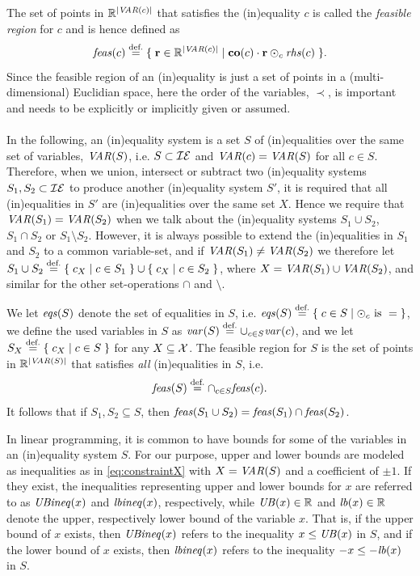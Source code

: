 The set of points in $\mathbb{R}^{|\mathit{VAR}(c)|}$ that satisfies the (in)equality $c$ is called the \emph{feasible region} for $c$ and is hence defined as
\[
\mathit{feas}(c) \overset{\text{def.}}= \{\;{\mathbf{r}\in\mathbb{R}^{|\mathit{VAR}(c)|}}\;|\;{\mathbf{co}(c)\cdot\mathbf{r}\odot_c \mathit{rhs}(c)}\;\}.
\] 
Since the feasible region of an (in)equality is just a set of points in a (multi-dimensional) Euclidian space, here the order of the variables, $\prec$, is important and needs to be explicitly or implicitly given or assumed.
\\\\
In the following, an (in)equality system is a set $S$ of (in)equalities over the same set of variables, $\mathit{VAR}(S)$, i.e. $S\subset\mathcal{IE}$ and $\mathit{VAR}(c)=\mathit{VAR}(S)$ for all $c\in S$. Therefore, when we union, intersect or subtract two (in)equality systems $S_1, S_2\subset \mathcal{IE}$ to produce another (in)equality system $S'$, it is required that all (in)equalities in $S'$ are (in)equalities over the same set $X$. Hence we require that $\mathit{VAR}(S_1) = \mathit{VAR}(S_2)$ when we talk about the (in)equality systems $S_1\cup S_2$, $S_1\cap S_2$ or $S_1\setminus S_2$. However, it is always possible to extend the (in)equalities in $S_1$ and $S_2$ to a common variable-set, and if $\mathit{VAR}(S_1)\neq \mathit{VAR}(S_2)$ we therefore let $S_1\cup S_2\overset{\text{def.}}= \{\;{c_X}\;|\;{c\in S_1}\;\}\cup \{\;{c_X}\;|\;{c\in S_2}\;\}$, where $X=\mathit{VAR}(S_1)\cup\mathit{VAR}(S_2)$, and similar for the other set-operations $\cap$ and $\setminus$. 

We let $\mathit{eqs}(S)$ denote the set of equalities in $S$, i.e. $\mathit{eqs}(S) \overset{\text{def.}}= \{\;{c \in S}\;|\;{\odot_c \text{ is } =}\;\}$, we define the used variables in $S$ as
$\mathit{var}(S)\overset{\text{def.}}= \cup_{c\in S}\mathit{var}(c)$, and we let $S_X \overset{\text{def.}}= \{\;{c_X}\;|\;{c\in S}\;\}$ for any $X\subseteq \mathcal{X}$.
The feasible region for $S$ is the set of points in $\mathbb{R}^{|\mathit{VAR}(S)|}$ that satisfies \emph{all} (in)equalities in $S$, i.e. 
\[
\mathit{feas}(S) \overset{\text{def.}}= \cap_{c\in S}\mathit{feas}(c).
\]
It follows that if $S_1, S_2\subseteq S$, then $\feas(S_1\cup S_2) = %
\feas(S_1)\cap \feas(S_2)$. 

In linear programming, it is common to have bounds for some of the variables in an (in)equality system $S$. For our purpose, upper and lower bounds are modeled as inequalities as in \eqref{eq:constraintX} with $X=\mathit{VAR}(S)$ and a coefficient of $\pm 1$. If they exist, the inequalities representing upper and lower bounds for $x$ are referred to as $\mathit{UBineq}(x)$ and $\mathit{lbineq}(x)$, respectively, while $\mathit{UB}(x)\in \mathbb{R}$ and $\mathit{lb}(x)\in\mathbb{R}$ denote the upper, respectively lower bound of the variable $x$. 
That is, if the upper bound of $x$ exists, then $\mathit{UBineq}(x)$ refers to the inequality $x\leq \mathit{UB}(x)$ in $S$, and if the lower bound of $x$ exists, then $\mathit{lbineq}(x)$ refers to the inequality $-x \leq -\mathit{lb}(x)$ in $S$.


